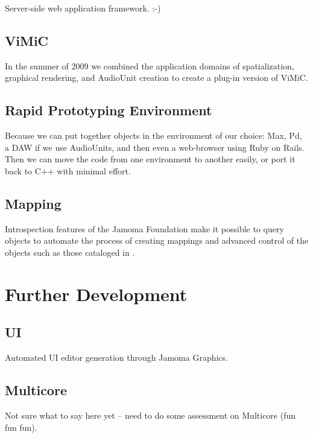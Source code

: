 \documentclass[twoside,10pt]{article}
\begin{document}
Server-side web application framework.  :-)

\subsection{ViMiC}
In the summer of 2009 we combined the application domains of spatialization, graphical rendering, and AudioUnit creation to create a plug-in version of ViMiC\cite{Peters:2008b}.


\subsection{Rapid Prototyping Environment}

Because we can put together objects in the environment of our choice: Max, Pd, a DAW if we use AudioUnits, and then even a web-browser using Ruby on Rails.  Then we can move the code from one environment to another easily, or port it back to C++ with minimal effort.

\subsection{Mapping}

Introspection features of the Jamoma Foundation make it possible to query objects to automate the process of creating mappings and advanced control of the objects such as those cataloged in \cite{Pendharkar:2006}.  




\section{Further Development} %

\subsection{UI}

Automated UI editor generation through Jamoma Graphics.

\subsection{Multicore}

Not sure what to say here yet -- need to do some assessment on Multicore (fun fun fun).
\end{document}
